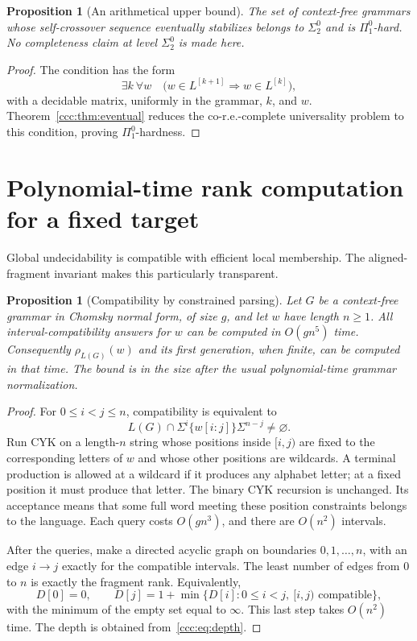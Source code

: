 \documentclass[11pt,letterpaper]{article}
\newtheorem{proposition}[theorem]{Proposition}
\theoremstyle{definition}
\theoremstyle{remark}
\newcommand{\gen}[2]{#1^{[#2]}}
\newcommand{\rank}{\rho}
\begin{document}
\begin{proposition}[An arithmetical upper bound]\label{ccc:prop:arithmetical}
The set of context-free grammars whose self-crossover sequence eventually
stabilizes belongs to $\Sigma^0_2$ and is $\Pi^0_1$-hard. No completeness
claim at level $\Sigma^0_2$ is made here.
\end{proposition}
\begin{proof}
The condition has the form
\[
 \exists k\ \forall w\quad
 \bigl(w\in\gen L{k+1}\Longrightarrow w\in\gen Lk\bigr),
\]
with a decidable matrix, uniformly in the grammar, $k$, and $w$.
Theorem~\ref{ccc:thm:eventual} reduces the co-r.e.-complete universality problem
to this condition, proving $\Pi^0_1$-hardness.
\end{proof}

\section{Polynomial-time rank computation for a fixed target}
\label{ccc:sec:membership}

Global undecidability is compatible with efficient local membership. The
aligned-fragment invariant makes this particularly transparent.

\begin{proposition}[Compatibility by constrained parsing]\label{ccc:prop:parsing}
Let $G$ be a context-free grammar in Chomsky normal form, of size $g$, and let
$w$ have length $n\geq1$. All interval-compatibility answers for $w$ can be
computed in $O(gn^5)$ time. Consequently $\rank_{L(G)}(w)$ and its first
generation, when finite, can be computed in that time.
The bound is in the size after the usual polynomial-time grammar normalization.
\end{proposition}
\begin{proof}
For $0\leq i<j\leq n$, compatibility is equivalent to
\begin{equation}
 L(G)\cap\Sigma^i\{w[i:j]\}\Sigma^{n-j}\ne\varnothing.
 \label{ccc:eq:compatibilityquery}
\end{equation}
Run CYK on a length-$n$ string whose positions inside $[i,j)$ are fixed to the
corresponding letters of $w$ and whose other positions are wildcards. A
terminal production is allowed at a wildcard if it produces any alphabet
letter; at a fixed position it must produce that letter. The binary CYK
recursion is unchanged. Its acceptance means that some full word meeting
these position constraints belongs to the language. Each query costs
$O(gn^3)$, and there are $O(n^2)$ intervals.

After the queries, make a directed acyclic graph on boundaries
$0,1,\ldots,n$, with an edge $i\to j$ exactly for the compatible intervals.
The least number of edges from $0$ to $n$ is exactly the fragment rank.
Equivalently,
\[
 D[0]=0,\qquad
 D[j]=1+\min\{D[i]:0\leq i<j,\ [i,j)\text{ compatible}\},
\]
with the minimum of the empty set equal to $\infty$. This last step takes
$O(n^2)$ time. The depth is obtained from~\eqref{ccc:eq:depth}.
\end{proof}
\end{document}
